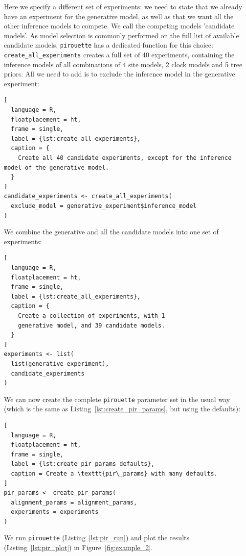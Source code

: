 Here we specify a different set of experiments: we
need to state that we already have an experiment for
the generative model, as well as that we want all the other inference models 
to compete. We call the competing models 'candidate models'.
As model selection is commonly performed on the full list of available 
candidate models, \verb;pirouette; has a dedicated function for this choice: \verb;create_all_experiments; creates a full set of 40 experiments, 
containing the inference models of all combinations of 4 site models, 
2 clock models and 5 tree priors. All we need to add is to exclude the 
inference model in the generative experiment:

\begin{lstlisting}[
  language = R, 
  floatplacement = ht, 
  frame = single, 
  label = {lst:create_all_experiments},
  caption = {
    Create all 40 candidate experiments, except for the inference model of the generative model.
  }
]
candidate_experiments <- create_all_experiments(
  exclude_model = generative_experiment$inference_model
)
\end{lstlisting}

We combine the generative and all the candidate models into one set of 
experiments:

\begin{lstlisting}[
  language = R, 
  floatplacement = ht, 
  frame = single, 
  label = {lst:create_all_experiments},
  caption = {
    Create a collection of experiments, with 1
    generative model, and 39 candidate models.
  }
]
experiments <- list(
  list(generative_experiment),
  candidate_experiments
)
\end{lstlisting}

We can now create the complete \verb;pirouette; parameter set in the usual 
way (which is the same as Listing~\ref{lst:create_pir_params}, but using the 
defaults):

\begin{lstlisting}[
  language = R,
  floatplacement = ht,
  frame = single,
  label = {lst:create_pir_params_defaults},
  caption = Create a \texttt{pir\_params} with many defaults.
]
pir_params <- create_pir_params(
  alignment_params = alignment_params,
  experiments = experiments
)
\end{lstlisting}

We run \verb;pirouette; (Listing~\ref{lst:pir_run}) 
and plot the results (Listing~\ref{lst:pir_plot}) in Figure~\ref{fig:example_2}.

